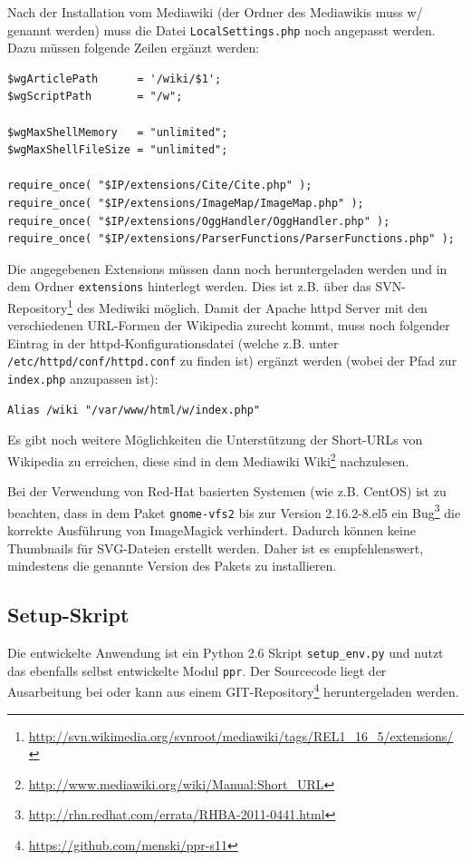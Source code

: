Nach der Installation vom Mediawiki (der Ordner des Mediawikis muss \glqq{}w/\grqq{} genannt werden) muss die Datei \texttt{LocalSettings.php} noch angepasst werden. Dazu müssen folgende Zeilen ergänzt werden:
\begin{verbatim}
$wgArticlePath      = '/wiki/$1';
$wgScriptPath       = "/w";

$wgMaxShellMemory   = "unlimited";
$wgMaxShellFileSize = "unlimited";

require_once( "$IP/extensions/Cite/Cite.php" );
require_once( "$IP/extensions/ImageMap/ImageMap.php" );
require_once( "$IP/extensions/OggHandler/OggHandler.php" );
require_once( "$IP/extensions/ParserFunctions/ParserFunctions.php" );
\end{verbatim}
Die angegebenen Extensions müssen dann noch heruntergeladen werden und in dem Ordner \texttt{extensions} hinterlegt werden. Dies ist z.B. über das SVN-Repository\footnote{\url{http://svn.wikimedia.org/svnroot/mediawiki/tags/REL1_16_5/extensions/}} des Mediwiki möglich. Damit der Apache httpd Server mit den verschiedenen URL-Formen der Wikipedia zurecht kommt, muss noch folgender Eintrag in der httpd-Konfigurationsdatei (welche z.B. unter  \texttt{/etc/httpd/conf/httpd.conf} zu finden ist) ergänzt werden (wobei der Pfad zur \texttt{index.php} anzupassen ist):
\begin{verbatim}
Alias /wiki "/var/www/html/w/index.php"
\end{verbatim}
Es gibt noch weitere Möglichkeiten die Unterstützung der Short-URLs von Wikipedia zu erreichen, diese sind in dem Mediawiki Wiki\footnote{\url{http://www.mediawiki.org/wiki/Manual:Short_URL}} nachzulesen.

Bei der Verwendung von Red-Hat basierten Systemen (wie z.B. CentOS) ist zu beachten, dass in dem Paket \texttt{gnome-vfs2} bis zur Version 2.16.2-8.el5 ein Bug\footnote{\url{http://rhn.redhat.com/errata/RHBA-2011-0441.html}} die korrekte Ausführung von ImageMagick verhindert. Dadurch können keine Thumbnails für SVG-Dateien erstellt werden. Daher ist es empfehlenswert, mindestens die genannte Version des Pakets zu installieren.

\subsection{Setup-Skript}
\label{sec:setupskript}
Die entwickelte Anwendung ist ein Python 2.6 Skript \texttt{setup\_env.py} und nutzt das ebenfalls selbst entwickelte Modul \texttt{ppr}. Der Sourcecode liegt der Ausarbeitung bei oder kann aus einem GIT-Repository\footnote{\url{https://github.com/menski/ppr-s11}} heruntergeladen werden.

